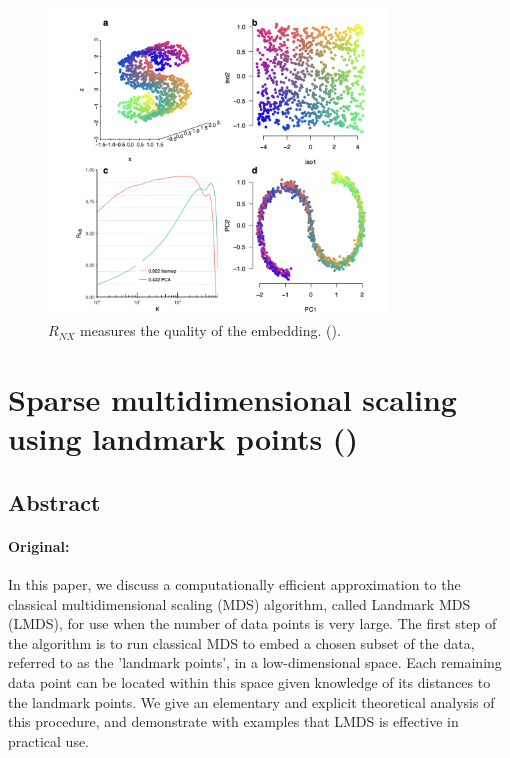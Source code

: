 \documentclass[a4paper,12pt]{article}
\begin{document}
\begin{figure}[ht]
    \centering
    \includegraphics[width=0.8\textwidth]{figures/dimRed_R_NX.png}
    \caption{$R_{NX}$ measures the quality of the embedding. (\cite{Kraemer2018}).}
    \label{fig:dimRed_R_NX}
\end{figure}


\pagebreak
\section{Sparse multidimensional scaling
using landmark points (\texorpdfstring{\cite{DeSilva2004}}{})}
\label{sec:LMDS:2004}

\subsection{Abstract}

\paragraph{Original:} In this paper, we discuss a computationally eﬃcient approximation to the classical multidimensional scaling (MDS) algorithm, called Landmark MDS (LMDS), for use when the number of data points is very large. The first step of the algorithm is to run classical MDS to embed a chosen subset of the data, referred to as the 'landmark points', in a low-dimensional space. Each remaining data point can be located within this space given knowledge of its distances to the landmark points. We give an elementary and explicit theoretical analysis of this procedure, and demonstrate with examples that LMDS is eﬀective in practical use.
\end{document}

